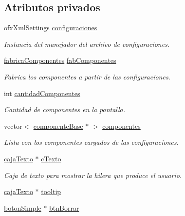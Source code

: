 \subsection*{Atributos privados}
\begin{DoxyCompactItemize}
\item 
ofx\+Xml\+Settings \hyperlink{classespacio_teclado_af215829331b2ed6d0a4485eab2a37311}{configuraciones}
\begin{DoxyCompactList}\small\item\em Instancia del manejador del archivo de configuraciones. \end{DoxyCompactList}\item 
\hyperlink{classfabrica_componentes}{fabrica\+Componentes} \hyperlink{classespacio_teclado_aaa53bfd0abe00de252f38c299174f0d1}{fab\+Componentes}
\begin{DoxyCompactList}\small\item\em Fabrica los componentes a partir de las configuraciones. \end{DoxyCompactList}\item 
int \hyperlink{classespacio_teclado_ac6f638174ab5143b45b5a0658f6782e9}{cantidad\+Componentes}
\begin{DoxyCompactList}\small\item\em Cantidad de componentes en la pantalla. \end{DoxyCompactList}\item 
vector$<$ \hyperlink{classcomponente_base}{componente\+Base} $\ast$ $>$ \hyperlink{classespacio_teclado_aad1549ce795db466bad7c47a5f82582c}{componentes}
\begin{DoxyCompactList}\small\item\em Lista con los componentes cargados de las configuraciones. \end{DoxyCompactList}\item 
\hyperlink{classcaja_texto}{caja\+Texto} $\ast$ \hyperlink{classespacio_teclado_ac4d882599a627a2d26aa19280fb1cf28}{c\+Texto}
\begin{DoxyCompactList}\small\item\em Caja de texto para mostrar la hilera que produce el usuario. \end{DoxyCompactList}\item 
\hyperlink{classcaja_texto}{caja\+Texto} $\ast$ \hyperlink{classespacio_teclado_a795ef319723578fffd7d3d1cb8db982e}{tooltip}
\item 
\hyperlink{classboton_simple}{boton\+Simple} $\ast$ \hyperlink{classespacio_teclado_a68242d035fdf24a605e21d798ecf1a93}{btn\+Borrar}

\end{DoxyCompactItemize}

